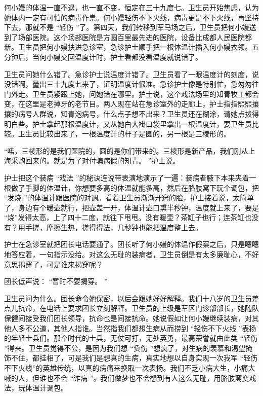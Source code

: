 \documentclass[12pt,twoside,openany]{book}
\begin{document}
何小嫚的体温一直不退，也一直不变，恒定在三十九度七。卫生员开始焦虑，认为她体内一定有可怕的病毒作祟。何小嫚轻伤不下火线，病毒更是不下火线，再坚持下去，那就不是 “轻伤 ”了。第四天，我们转移到军马场之后，卫生员把何小嫚送到了场部医院。这个场部医院是方圆百里最先进的医院，设备比成都人民医院都新。卫生员把何小嫚扶进急诊室，急诊护士顺手把一根体温计插入何小嫚衣领。五分钟后，当何小嫚交回温度计时，护士看都没看温度就说错了。

卫生员问她什么错了。急诊护士说温度计错了。卫生员看了一眼温度计的刻度，说没错啊，量出三十九度七来了，证明温度计很准。急诊护士像是特别忙，急匆匆往门外走。卫生员紧跟上她，问她错在哪里。护士说，这个戏法场里的知青牧工都会变，在这里是老掉牙的老节目。两人现在站在急诊室外的走廊上，护士指指熙熙攘攘的病号人群说，知青泡病号，什么点子想不出来？卫生员还在糊涂，请她点拨得明白些。护士拿起那根温度计，又从她白大褂口袋里拿出一根温度计，要卫生员比较。卫生员比较出来了，一根温度计的杆子是圆的，另一根是三棱形的。

“喏，三棱形的是我们医院的，圆的是你们带来的。三棱形是新产品，我们刚从上海采购回来的。就是为了对付骗病假的知青。 ”护士说。

护士把这个装病 “戏法 ”的秘诀连说带表演地演示了一遍：装病者腋下本来夹着一根做了手脚的体温计，你想要多高的体温就能多高，然后在胳肢窝下玩个调包，把 “发烧 ”的体温计跟医院的对调。看着卫生员渐渐开窍的脸，护士接着说，太简单了，身边有个暖壶就行，把壶盖一开，体温计壶口熏半秒钟，温度就上来了，要是 “烧”发得太高，上了四十二度，就往下甩甩。没有暖壶？茶缸子也行；连茶缸也没有？用手搓，摩擦生热，搓得得法，几秒钟也能把温度整上去。

护士在急诊室就把团长电话要通了。团长听了何小嫚的体温作假案之后，只是嗯嗯地答应着，一句指示没给。对这么无耻的装病者，卫生员倒是有太多廉耻心，不好意思揭穿了，可是谁来揭穿呢？

团长低声说： “暂时不要揭穿。 ”

卫生员问为什么。团长命令她保密，以后会跟她好好解释。我们十八岁的卫生员差点儿抗命，在电话上要求团长立刻解释。卫生员的上级是军区门诊部部长，她随队保健间接受我们团长领导，抗命也是间接抗命。她说假如让何小嫚继续装病，对其他人多不公道，其他人指谁。当然指我们都想生病从而捞到 “轻伤不下火线 ”表扬的年轻士兵们。那个时代的士兵，无仗可打，无处英勇，最高荣誉就由此类 “轻伤 ”得来。卫生员觉得不公，是因为我们想 “负伤 ”想疯了，对生病的羡慕和渴望掩饰不住，都挂相了，可是我们是想真的生病，真实地想以自身实现一次我军 “轻伤不下火线”的英雄传统，以真的病痛来换取一次表扬。我们不乏小病大生，小痛大喊的人，但谁也不会 “诈病 ”。我们做梦也不会想到有人这么无耻，用胳肢窝变戏法，玩体温计调包。
\end{document}
